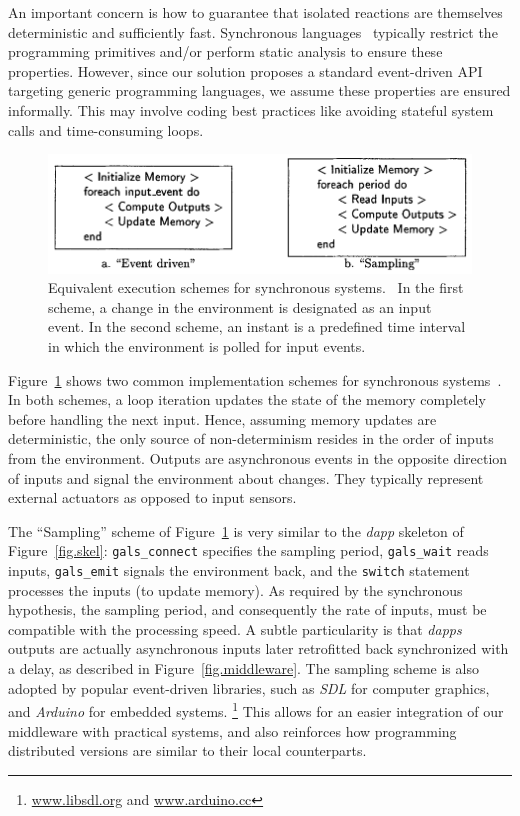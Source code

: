 \documentclass[sigplan,screen]{acmart}
\begin{document}
An important concern is how to guarantee that isolated reactions are themselves
deterministic and sufficiently fast.
Synchronous languages~\cite{langs} typically restrict the programming
primitives and/or perform static analysis to ensure these properties.
However, since our solution proposes a standard event-driven API targeting
generic programming languages, we assume these properties are ensured
informally.
This may involve coding best practices like avoiding stateful system calls and
time-consuming loops.

\begin{figure}[t]
  \centering
  \includegraphics[width=\linewidth]{schemes}
  \caption{
    \label{fig.schemes}
    Equivalent execution schemes for synchronous systems.~\cite{schemes}
    In the first scheme, a change in the environment is designated as an input
    event. 
    In the second scheme, an instant is a predefined time interval in which
    the environment is polled for input events.
  }
\end{figure}

Figure~\ref{fig.schemes} shows two common implementation schemes for
synchronous systems~\cite{schemes}.
In both schemes, a loop iteration updates the state of the memory completely
before handling the next input.
Hence, assuming memory updates are deterministic, the only source of
non-determinism resides in the order of inputs from the environment.
Outputs are asynchronous events in the opposite direction of inputs and
signal the environment about changes.
They typically represent external actuators as opposed to input sensors.

The ``Sampling'' scheme of Figure~\ref{fig.schemes} is very similar to the
\emph{dapp} skeleton of Figure~\ref{fig.skel}:
    \texttt{gals\_connect} specifies the sampling period,
    \texttt{gals\_wait} reads inputs,
    \texttt{gals\_emit} signals the environment back, and
    the \texttt{switch} statement processes the inputs (to update memory).
As required by the synchronous hypothesis, the sampling period, and
consequently the rate of inputs, must be compatible with the processing speed.
A subtle particularity is that \emph{dapps} outputs are actually asynchronous
inputs later retrofitted back synchronized with a delay, as described in
Figure~\ref{fig.middleware}.
%
The sampling scheme is also adopted by popular event-driven libraries, such as
\emph{SDL} for computer graphics, and \emph{Arduino} for embedded systems.%
\footnote{\url{www.libsdl.org} and \url{www.arduino.cc}}
This allows for an easier integration of our middleware with practical systems,
and also reinforces how programming distributed versions are similar to their
local counterparts.
\end{document}
